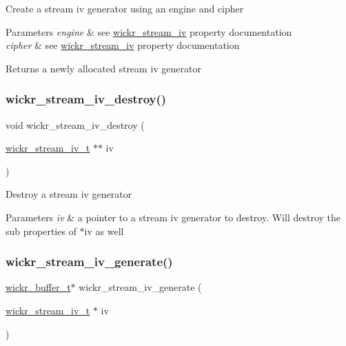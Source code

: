 Create a stream iv generator using an engine and cipher


\begin{DoxyParams}{Parameters}
{\em engine} & see \textquotesingle{}\mbox{\hyperlink{structwickr__stream__iv}{wickr\+\_\+stream\+\_\+iv}}\textquotesingle{} property documentation \\
\hline
{\em cipher} & see \textquotesingle{}\mbox{\hyperlink{structwickr__stream__iv}{wickr\+\_\+stream\+\_\+iv}}\textquotesingle{} property documentation\\
\hline
\end{DoxyParams}
\begin{DoxyReturn}{Returns}
a newly allocated stream iv generator 
\end{DoxyReturn}
\mbox{\label{group__wickr__stream__iv_gad6ac87d891822a866a0d7cad48f79e27}} 
\subsubsection{\texorpdfstring{wickr\_stream\_iv\_destroy()}{wickr\_stream\_iv\_destroy()}}
{\footnotesize\ttfamily void wickr\+\_\+stream\+\_\+iv\+\_\+destroy (\begin{DoxyParamCaption}\item[{\mbox{\hyperlink{structwickr__stream__iv}{wickr\+\_\+stream\+\_\+iv\+\_\+t}} $\ast$$\ast$}]{iv }\end{DoxyParamCaption})}

Destroy a stream iv generator


\begin{DoxyParams}{Parameters}
{\em iv} & a pointer to a stream iv generator to destroy. Will destroy the sub properties of \textquotesingle{}$\ast$iv\textquotesingle{} as well \\
\hline
\end{DoxyParams}
\mbox{\label{group__wickr__stream__iv_gaddcfdc9904ec0ffd32ce8f988aefc484}} 
\subsubsection{\texorpdfstring{wickr\_stream\_iv\_generate()}{wickr\_stream\_iv\_generate()}}
{\footnotesize\ttfamily \mbox{\hyperlink{structwickr__buffer}{wickr\+\_\+buffer\+\_\+t}}$\ast$ wickr\+\_\+stream\+\_\+iv\+\_\+generate (\begin{DoxyParamCaption}\item[{\mbox{\hyperlink{structwickr__stream__iv}{wickr\+\_\+stream\+\_\+iv\+\_\+t}} $\ast$}]{iv }\end{DoxyParamCaption})}

